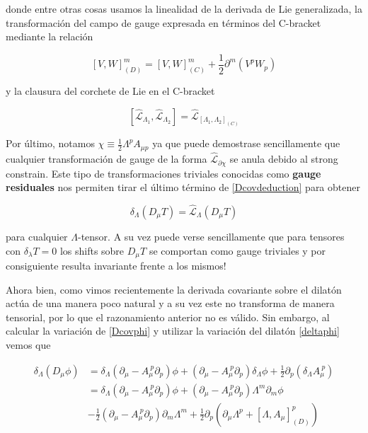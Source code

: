 \documentclass{article}
\numberwithin{equation}{section}
\begin{document}
donde entre otras cosas usamos la linealidad de la derivada de Lie generalizada, la transformación del campo de gauge expresada en términos del C-bracket mediante la relación

\begin{equation}
\left[V,W\right]_{(D)}^{m} = \left[V,W\right]_{(C)}^{m} + \frac{1}{2} \partial^m \left(V^p W_p\right) 
\end{equation}

y la clausura del corchete de Lie en el C-bracket

\begin{equation}
\left[\hat{\mathcal{L}}_{\Lambda_1}, \hat{\mathcal{L}}_{\Lambda_2} \right] = \hat{\mathcal{L}}_{ \left[\Lambda_1, \Lambda_2\right]_{(C)}}
\end{equation}

Por último, notamos $ \chi \equiv \frac{1}{2} \Lambda^p A_{\mu p} $ ya que puede demostrase sencillamente que cualquier transformación de gauge de la forma $ \hat{\mathcal{L}}_{\partial \chi} $ se anula debido al strong constrain. Este tipo de transformaciones triviales conocidas como \textbf{gauge residuales} nos permiten tirar el último término de \ref{Dcovdeduction} para obtener\\

\begin{boxeq}
	\begin{equation}\label{lieclausura}
	\delta_{\Lambda} \left( D_{\mu} T \right) = \hat{\mathcal{L}}_{\Lambda} \left( D_{\mu} T \right)
	\end{equation}
\end{boxeq}


para cualquier $ \Lambda$-tensor. A su vez puede verse sencillamente que para tensores con $ \delta_{\lambda} T = 0 $ los shifts sobre $ D_{\mu} T $ se comportan como gauge triviales y por consiguiente resulta invariante frente a los mismos! 

Ahora bien, como vimos recientemente la derivada covariante sobre el dilatón actúa de una manera poco natural y a su vez este no transforma de manera tensorial, por lo que el razonamiento anterior no es válido. Sin embargo, al calcular la variación de \ref{Dcovphi} y utilizar la variación del dilatón \ref{deltaphi} vemos que 

\begin{equation}
\begin{aligned}
\delta_{\Lambda} \left( D_{\mu} \phi\right) &= \delta_{\Lambda} \left( \partial_{\mu} - A_{\mu}^{\ p} \partial_p \right)\phi + \left( \partial_{\mu} - A_{\mu}^{\ p} \partial_p \right)\delta_{\Lambda} \phi + \frac{1}{2} \partial_p \left( \delta_{\Lambda} A_{\mu}^{\ p} \right)\\
&=\delta_{\Lambda} \left( \partial_{\mu} - A_{\mu}^{\ p} \partial_p \right)\phi + \left( \partial_{\mu} - A_{\mu}^{\ p} \partial_p \right)\Lambda^m \partial_m \phi\\
&-\frac{1}{2}\left( \partial_{\mu} - A_{\mu}^{\ p} \partial_p \right) \partial_m \Lambda^m + \frac{1}{2} \partial_p \left(\partial_{\mu} \Lambda^p + \left[\Lambda, A_{\mu}\right]_{(D)}^p\right) 
\end{aligned}
\end{equation}
\end{document}
